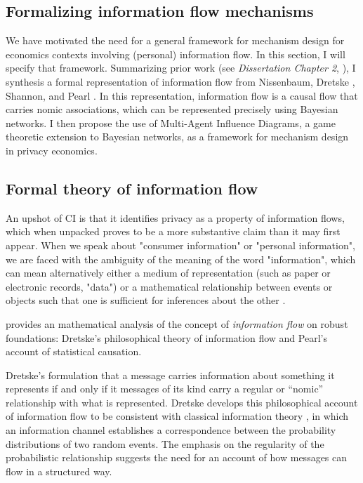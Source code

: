 \documentclass[../thesis.tex]{subfiles}
\begin{document}
\subsection{Formalizing information flow mechanisms}
\label{sec:formalizing}

We have motivated the need for a general framework
for mechanism design for economics contexts involving
(personal) information flow.
In this section, I will specify that framework.
Summarizing prior work (see \emph{Dissertation Chapter 2},
\cite{benthall2017origin}), I synthesis a formal representation
of information flow from Nissenbaum,
Dretske \cite{dretske1981knowledge},
Shannon,
and Pearl \cite{pearl1988probabilistic}.
In this representation, information flow is a causal flow
that carries nomic associations, which can be represented
precisely using Bayesian networks.
I then propose the use of Multi-Agent Influence Diagrams,
a game theoretic extension to Bayesian networks, as
a framework for mechanism design in privacy economics.
\cite{koller2003multi}

\subsection{Formal theory of information flow}

An upshot of CI is that it identifies privacy as a 
property of information flows, which when unpacked proves
to be a more substantive claim than it may first appear.
When we speak about "consumer information" or 
"personal information", we are faced with the ambiguity
of the meaning of the word "information", which can mean
alternatively either a medium of representation (such as
paper or electronic records, "data") or a mathematical
relationship between events or objects such that one
is sufficient for inferences about the other
\cite{nunberg1996farewell}.

\cite{benthall2017origin} provides an mathematical
analysis of the concept of \emph{information flow}
on robust foundations: Dretske's philosophical theory
of information flow and Pearl's account of statistical
causation.

Dretske's \cite{dretske1981knowledge} formulation
that a message carries information about something it represents
if and only if it messages of its kind carry a regular or ``nomic''
relationship with what is represented.
Dretske develops this philosophical account of information flow
to be consistent with classical information theory
\cite{shannon1948mathematical}, in which an information channel
establishes a correspondence between the probability distributions
of two random events.
The emphasis on the regularity of the probabilistic relationship
suggests the need for an account of how messages can flow
in a structured way.
\end{document}
